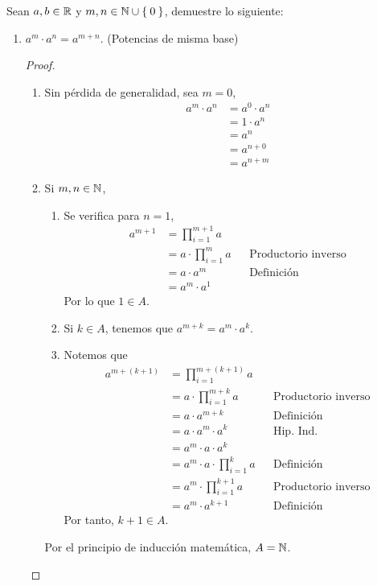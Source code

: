 Sean $a,b\in \mathbb{R}$ y $m, n\in \mathbb{N}\cup\Set{0}$, demuestre lo siguiente:

\begin{enumerate}[label=\alph*)]
  \item $a^m \cdot a^n = a^{m+n}$. (Potencias de misma base)
  \begin{proof}\leavevmode
    \begin{enumerate}[label=\Roman*)]
      \item Sin pérdida de generalidad, sea $m=0$,
      \begin{align*}
        a^m \cdot a^n &= a^0 \cdot a^n\\
        &= 1 \cdot a^n\\
        &= a^n\\
        &= a^{n+0}\\
        &= a^{n+m}
      \end{align*}
      \item Si $m,n\in \mathbb{N}$,
      \begin{enumerate}[label=\roman*)]
        \item Se verifica para $n=1$, 
        \begin{align*}
          a^{m+1} &= \prod_{i=1}^{m+1} a\\
          &= a \cdot \prod_{i=1}^{m} a && \text{Productorio inverso}\\
          &= a \cdot a^m && \text{Definición}\\
          &= a^m \cdot a^1
        \end{align*}
        Por lo que $1\in A$.
        \item Si $k\in A$, tenemos que $a^{m+k} = a^m\cdot a^k$.
        \item Notemos que
        \begin{align*}
          a^{m+(k+1)} &= \prod_{i=1}^{m+(k+1)} a\\
          &= a \cdot \prod_{i=1}^{m+k} a && \text{Productorio inverso}\\
          &= a \cdot a^{m+k} && \text{Definición}\\
          &= a\cdot a^m \cdot a^k && \text{Hip. Ind.}\\
          &= a^m \cdot a\cdot a^k\\
          &= a^m \cdot a \cdot \prod_{i=1}^{k} a && \text{Definición}\\
          &= a^m \cdot \prod_{i=1}^{k+1} a && \text{Productorio inverso}\\
          &= a^m \cdot a^{k+1} && \text{Definición}
        \end{align*}
        Por tanto, $k+1\in A$.
      \end{enumerate}
      Por el principio de inducción matemática, $A=\mathbb{N}$.
      \end{enumerate}
  \end{proof}
  

\end{enumerate}
